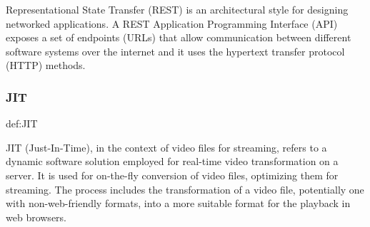 \documentclass[../MasterThesis.tex]{subfiles}
\begin{document}
Representational State Transfer (REST) is an architectural style for designing networked applications. A REST Application Programming Interface (API) exposes a set of endpoints (URLs) that allow communication between different software systems over the internet and it uses the hypertext transfer protocol (HTTP) methods.~\cite{IEEE_Rest, webservice, Nodejs_Rest}











\subsubsection*{JIT} 
%
\begin{CountingDefinition}[JIT]{def:JIT}
	
	JIT (Just-In-Time), in the context of video files for streaming, refers to a dynamic software solution employed for real-time video transformation on a server. It is used for on-the-fly conversion of video files, optimizing them for streaming. The process includes the transformation of a video file, potentially one with non-web-friendly formats, into a more suitable format for the playback in web browsers.
	
\end{CountingDefinition}






	
	
	
	
\end{document}
